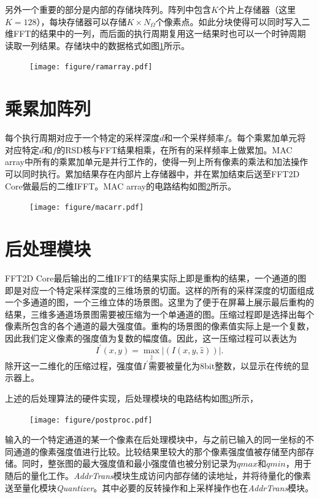 \documentclass[master]{shtthesis}             %
\begin{document}
另外一个重要的部分是内部的存储块阵列。阵列中包含$K$个片上存储器（这里$K=128$），每块存储器可以存储$K\times N_\Omega$个像素点。如此分块使得可以同时写入二维FFT的结果中的一列，而后面的执行周期复用这一结果时也可以一个时钟周期读取一列结果。存储块中的数据格式如图\ref{fig:ram_array}所示。
\begin{figure}[!tb]
    \centering
    \texttt{[image: figure/ramarray.pdf]}
    \label{fig:ram_array}
\end{figure}

\section{乘累加阵列}

每个执行周期对应于一个特定的采样深度$d$和一个采样频率$f$。每个乘累加单元将对应特定$d$和$f$的RSD核与FFT结果相乘，在所有的采样频率上做累加。MAC array中所有的乘累加单元是并行工作的，使得一列上所有像素的乘法和加法操作可以同时执行。累加结果存在内部片上存储器中，并在累加结束后送至FFT2D Core做最后的二维IFFT。MAC array的电路结构如图\ref{fig:macarr}所示。
\begin{figure}[!tb]
    \centering
    \texttt{[image: figure/macarr.pdf]}
    \label{fig:macarr}
\end{figure}

\section{后处理模块}

FFT2D Core最后输出的二维IFFT的结果实际上即是重构的结果，一个通道的图即是对应一个特定采样深度的三维场景的切面。这样的所有的采样深度的切面组成一个多通道的图，一个三维立体的场景图。这里为了便于在屏幕上展示最后重构的结果，三维多通道场景图需要被压缩为一个单通道的图。压缩过程即是选择出每个像素所包含的各个通道的最大强度值。重构的场景图的像素值实际上是一个复数，因此我们定义像素的强度值为复数的幅度值。因此，这一压缩过程可以表达为
\begin{equation}
    I^{\prime}(x, y) = \max_{\hat{z}} |(I(x, y, \hat{z}))|.
\end{equation}
除开这一二维化的压缩过程，强度值$I^\prime$需要被量化为8bit整数，以显示在传统的显示器上。

上述的后处理算法的硬件实现，后处理模块的电路结构如图\ref{fig:pp}所示，
\begin{figure}[!tb]
    \centering
    \texttt{[image: figure/postproc.pdf]}
    \label{fig:pp}
\end{figure}
输入的一个特定通道的某一个像素在后处理模块中，与之前已输入的同一坐标的不同通道的像素强度值进行比较。比较结果里较大的那个像素强度值被存储至内部存储。同时，整张图的最大强度值和最小强度值也被分别记录为$qmax$和$qmin$，用于随后的量化工作。\textit{AddrTrans}模块生成访问内部存储的读地址，并将待量化的像素送至量化模块\textit{Quantizer}。其中必要的反转操作和上采样操作也在\textit{AddrTrans}模块。
\end{document}
